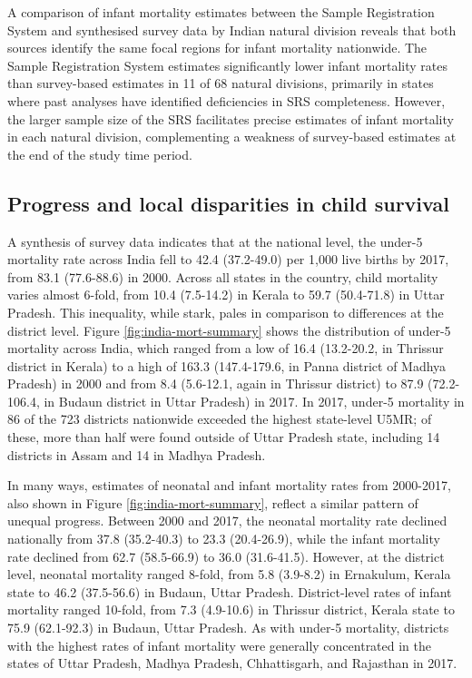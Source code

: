 \documentclass[
]{report}
\begin{document}
A comparison of infant mortality estimates between the Sample Registration System and synthesised survey data by Indian natural division reveals that both sources identify the same focal regions for infant mortality nationwide. The Sample Registration System estimates significantly lower infant mortality rates than survey-based estimates in 11 of 68 natural divisions, primarily in states where past analyses have identified deficiencies in SRS completeness. However, the larger sample size of the SRS facilitates precise estimates of infant mortality in each natural division, complementing a weakness of survey-based estimates at the end of the study time period.

\hypertarget{progress-and-local-disparities-in-child-survival}{%
\subsection{Progress and local disparities in child survival}\label{progress-and-local-disparities-in-child-survival}}

A synthesis of survey data indicates that at the national level, the under-5 mortality rate across India fell to 42.4 (37.2-49.0) per 1,000 live births by 2017, from 83.1 (77.6-88.6) in 2000. Across all states in the country, child mortality varies almost 6-fold, from 10.4 (7.5-14.2) in Kerala to 59.7 (50.4-71.8) in Uttar Pradesh. This inequality, while stark, pales in comparison to differences at the district level. Figure \ref{fig:india-mort-summary} shows the distribution of under-5 mortality across India, which ranged from a low of 16.4 (13.2-20.2, in Thrissur district in Kerala) to a high of 163.3 (147.4-179.6, in Panna district of Madhya Pradesh) in 2000 and from 8.4 (5.6-12.1, again in Thrissur district) to 87.9 (72.2-106.4, in Budaun district in Uttar Pradesh) in 2017. In 2017, under-5 mortality in 86 of the 723 districts nationwide exceeded the highest state-level U5MR; of these, more than half were found outside of Uttar Pradesh state, including 14 districts in Assam and 14 in Madhya Pradesh.

In many ways, estimates of neonatal and infant mortality rates from 2000-2017, also shown in Figure \ref{fig:india-mort-summary}, reflect a similar pattern of unequal progress. Between 2000 and 2017, the neonatal mortality rate declined nationally from 37.8 (35.2-40.3) to 23.3 (20.4-26.9), while the infant mortality rate declined from 62.7 (58.5-66.9) to 36.0 (31.6-41.5). However, at the district level, neonatal mortality ranged 8-fold, from 5.8 (3.9-8.2) in Ernakulum, Kerala state to 46.2 (37.5-56.6) in Budaun, Uttar Pradesh. District-level rates of infant mortality ranged 10-fold, from 7.3 (4.9-10.6) in Thrissur district, Kerala state to 75.9 (62.1-92.3) in Budaun, Uttar Pradesh. As with under-5 mortality, districts with the highest rates of infant mortality were generally concentrated in the states of Uttar Pradesh, Madhya Pradesh, Chhattisgarh, and Rajasthan in 2017.
\end{document}
